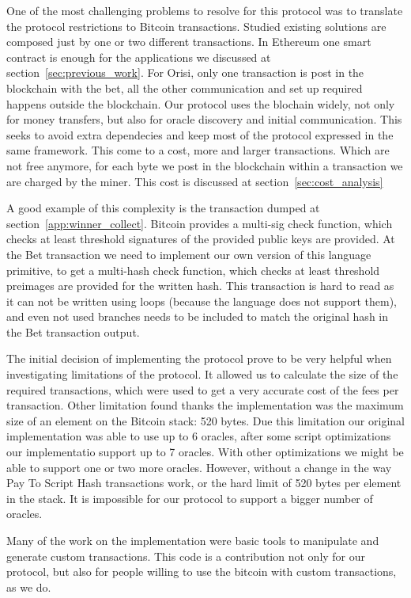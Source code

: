 One of the most challenging problems to resolve for this protocol was to
  translate the protocol restrictions to Bitcoin transactions.
Studied existing solutions are composed just by one or two different
  transactions.
In Ethereum one smart contract is enough for the applications we discussed at
  section~\ref{sec:previous_work}.
For Orisi, only one transaction is post in the blockchain with the bet, all
  the other communication and set up required happens outside the blockchain.
Our protocol uses the blochain widely, not only for money transfers, but also
  for oracle discovery and initial communication.
This seeks to avoid extra dependecies and keep most of the protocol expressed
  in the same framework.
This come to a cost, more and larger transactions.
Which are not free anymore, for each byte we post in the blockchain within
  a transaction we are charged by the miner.
This cost is discussed at section~\ref{sec:cost_analysis}

A good example of this complexity is the transaction dumped at
  section~\ref{app:winner_collect}.
Bitcoin provides a multi-sig check function, which checks at least
  threshold signatures of the provided public keys are provided.
At the Bet transaction we need to implement our own version of this
  language primitive, to get a multi-hash check function, which checks
  at least threshold preimages are provided for the written hash.
This transaction is hard to read as it can not be written using loops (because
  the language does not support them), and even not used branches needs to be
  included to match the original hash in the Bet transaction output.

The initial decision of implementing the protocol prove to be very helpful when
  investi\-ga\-ting limitations of the protocol.
It allowed us to calculate the size of the required transactions, which were
  used to get a very accurate cost of the fees per transaction.
Other limitation found thanks the implementation was the maximum size of an
  element on the Bitcoin stack: 520 bytes.
Due this limitation our original implementation was able to use up to 6 oracles,
  after some script optimizations our implementatio support up to 7 oracles.
With other optimizations we might be able to support one or two more oracles.
However, without a change in the way Pay To Script Hash transactions work, or
  the hard limit of 520 bytes per element in the stack.
It is impossible for our protocol to support a bigger number of oracles.

Many of the work on the implementation were basic tools to manipulate and
  generate custom transactions.
This code is a contribution not only for our protocol, but also for people
  willing to use the bitcoin with custom transactions, as we do.

